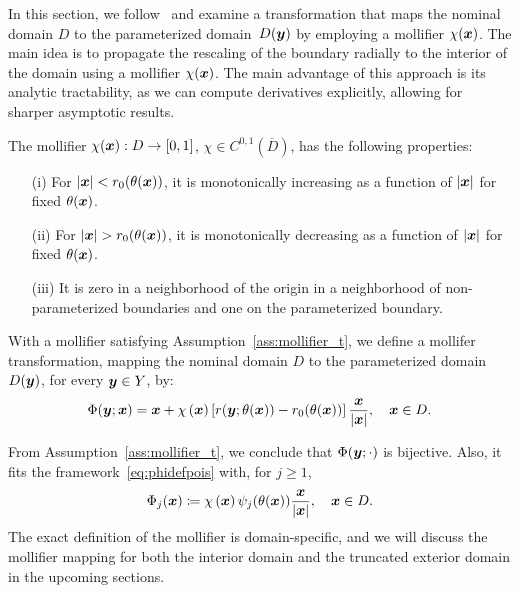 
In this section, we follow~\cite{hiptmair2018} and examine a transformation that maps the nominal domain ${D}$ to the parameterized domain $\mathop{}{D}({\bm{y}})$ by employing a mollifier $\chi({{\bm{x}}})$.
The main idea is to propagate the rescaling of the boundary radially to the interior of the domain using a mollifier $\chi({{\bm{x}}})$.
The main advantage of this approach is its analytic tractability, as we can compute derivatives explicitly, allowing for sharper asymptotic results.

\begin{assumption}\label{ass:mollifier_t}
The mollifier $\chi({{\bm{x}}}):{D} \to [0, 1]$, $\chi \in C^{0, 1} (\overline{{D}})$, has the following properties:
\begin{enumerate}
    \item[(i)] For $|{{\bm{x}}}| < r_0(\theta({{\bm{x}}}))$, it is monotonically increasing as a function of $|{{\bm{x}}}|$ for fixed $\theta({{\bm{x}}})$.
    \item[(ii)] For $|{{\bm{x}}}| > r_0(\theta({{\bm{x}}}))$, it is monotonically decreasing as a function of $|{{\bm{x}}}|$ for fixed $\theta({{\bm{x}}})$.
    \item[(iii)] It is zero in a neighborhood of the origin in a neighborhood of non-parameterized boundaries and one on the parameterized boundary.
\end{enumerate}
\end{assumption}

\begin{definition}
    With a mollifier satisfying Assumption~\ref{ass:mollifier_t}, we define a mollifer transformation, mapping the nominal domain ${D}$ to the parameterized domain ${D}({\bm{y}})$, for every ${\bm{y}}\in Y$, by:
    \begin{equation}
        \Phi({\bm{y}};{{\bm{x}}}) = {{\bm{x}}} + \chi\left({{\bm{x}}}\right)\left[ r({\bm{y}};\theta({{\bm{x}}})) - r_0(\theta({{\bm{x}}})) \right]\frac{{{\bm{x}}}}{|{{\bm{x}}}|},\quad  {{\bm{x}}} \in D. \label{eq:mollifiertransf}
    \end{equation}
\end{definition}

From Assumption~\ref{ass:mollifier_t}, we conclude that $\Phi({\bm{y}};\cdot)$ is bijective.
Also, it fits the framework~\eqref{eq:phidefpois} with, for $j\geq 1$,
\begin{equation}
    \Phi_j({{\bm{x}}})\coloneqq\chi\left({{\bm{x}}}\right)\psi_j(\theta({{\bm{x}}}))\frac{{{\bm{x}}}}{|{{\bm{x}}}|},\quad {{\bm{x}}}\in D.\label{eq:frameworkmapping}
\end{equation}
The exact definition of the mollifier is domain-specific, and we will discuss the mollifier mapping for both the interior domain and the truncated exterior domain in the upcoming sections.

